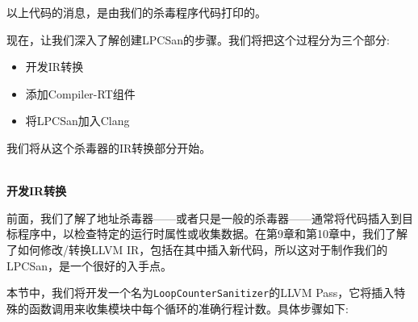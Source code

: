 以上代码的消息，是由我们的杀毒程序代码打印的。

现在，让我们深入了解创建LPCSan的步骤。我们将把这个过程分为三个部分:

\begin{itemize}
\item 开发IR转换
\item 添加Compiler-RT组件
\item 将LPCSan加入Clang
\end{itemize}

我们将从这个杀毒器的IR转换部分开始。


\hspace*{\fill} \\ %
\noindent
\textbf{开发IR转换}

前面，我们了解了地址杀毒器——或者只是一般的杀毒器——通常将代码插入到目标程序中，以检查特定的运行时属性或收集数据。在第9章和第10章中，我们了解了如何修改/转换LLVM IR，包括在其中插入新代码，所以这对于制作我们的LPCSan，是一个很好的入手点。

本节中，我们将开发一个名为\texttt{LoopCounterSanitizer}的LLVM Pass，它将插入特殊的函数调用来收集模块中每个循环的准确行程计数。具体步骤如下:

